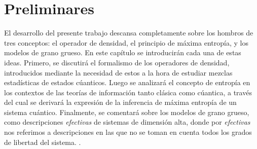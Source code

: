 \chapter{Preliminares}
El desarrollo del presente trabajo descansa completamente sobre los hombros de tres conceptos: el operador de densidad, el principio de máxima entropía, y los modelos de grano grueso. En este capítulo se introducirán cada una de estas ideas. Primero, se discutirá el formalismo de los operadores de densidad, introducidos mediante la necesidad de estos a la hora de estudiar mezclas estadísticas de estados cúanticos. Luego se analizará el concepto de entropía en los contextos de las teorías de información tanto clásica como cúantica, a través del cual se derivará la expresión de la inferencia de máxima entropía de un sistema cuántico. Finalmente, se comentará sobre los modelos de grano grueso, como descripciones \textit{efectivas} de sistemas de dimensión alta, donde por \textit{efectivas} nos referimos a descripciones en las que no se toman en cuenta todos los grados de libertad del sistema. . 





\newpage